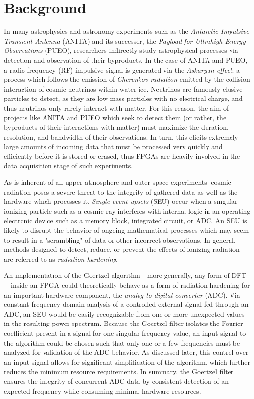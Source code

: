 \documentclass[reprint,amsmath,amssymb]{revtex4-2}
\begin{document}
\section{Background}

In many astrophysics and astronomy experiments such as the \textit{Antarctic Impulsive Transient Antenna} (ANITA) and its successor, the \textit{Payload for Ultrahigh Energy Observations} (PUEO), researchers indirectly study astrophysical processes via detection and observation of their byproducts. In the case of ANITA and PUEO, a radio-frequency (RF) impulsive signal is generated via the \textit{Askaryan effect}: a process which follows the emission of \textit{Cherenkov radiation} emitted by the collision interaction of cosmic neutrinos within water-ice. Neutrinos are famously elusive particles to detect, as they are low mass particles with no electrical charge, and thus neutrinos only rarely interact with matter. For this reason, the aim of projects like ANITA and PUEO which seek to detect them (or rather, the byproducts of their interactions with matter) must maximize the duration, resolution, and bandwidth of their observations. In turn, this elicits extremely large amounts of incoming data that must be processed very quickly and efficiently before it is stored or erased, thus FPGAs are heavily involved in the data acquisition stage of such experiments.

As is inherent of all upper atmosphere and outer space experiments, cosmic radiation poses a severe threat to the integrity of gathered data as well as the hardware which processes it. \textit{Single-event upsets} (SEU) occur when a singular ionizing particle such as a cosmic ray interferes with internal logic in an operating electronic device such as a memory block, integrated circuit, or ADC. An SEU is likely to disrupt the behavior of ongoing mathematical processes which may seem to result in a "scrambling" of data or other incorrect observations. In general, methods designed to detect, reduce, or prevent the effects of ionizing radiation are referred to as \textit{radiation hardening}.

An implementation of the Goertzel algorithm---more generally, any form of DFT---inside an FPGA could theoretically behave as a form of radiation hardening for an important hardware component, the \textit{analog-to-digital converter} (ADC). Via constant frequency-domain analysis of a controlled external signal fed through an ADC, an SEU would be easily recognizable from one or more unexpected values in the resulting power spectrum. Because the Goertzel filter isolates the Fourier coefficient present in a signal for one singular frequency value, an input signal to the algorithm could be chosen such that only one or a few frequencies must be analyzed for validation of the ADC behavior. As discussed later, this control over an input signal allows for significant simplification of the algorithm, which further reduces the minimum resource requirements. In summary, the Goertzel filter ensures the integrity of concurrent ADC data by consistent detection of an expected frequency while consuming minimal hardware resources.
\end{document}
